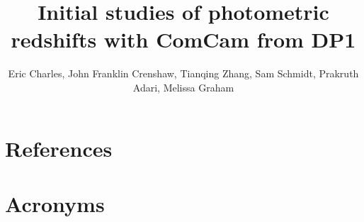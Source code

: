 \documentclass[SE,lsstdraft,authoryear,toc]{lsstdoc}
\title{Initial studies of photometric redshifts with ComCam from DP1}
\author{%
  Eric Charles,
  John Franklin Crenshaw,
  Tianqing Zhang, 
  Sam Schmidt,
  Prakruth Adari, 
  Melissa Graham
}
\date{\vcsDate}
\begin{document}
\maketitle




\appendix




\section{References} \label{sec:bib}
\renewcommand{\refname}{} %


\section{Acronyms} \label{sec:acronyms}

\end{document}
